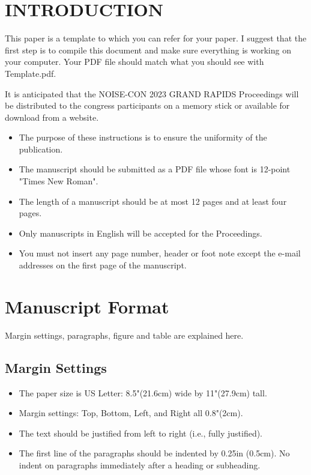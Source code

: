 \documentclass[letterpaper,12pt]{article}
\begin{document}
\section{INTRODUCTION}

\noindent
This paper is a template to which you can refer for your paper.  I suggest that the first step is to compile this document and make sure everything is working on your computer.  Your PDF file should match what you should see with Template.pdf. 

It is anticipated that the NOISE-CON 2023 GRAND RAPIDS Proceedings will be distributed to the congress participants on a memory stick or available for download from a website. 

\begin{itemize}[noitemsep]
\item 
The purpose of these instructions is to ensure the uniformity of the publication. 
\item
The manuscript should be submitted as a PDF file whose font is 12-point "Times New Roman".
\item
The length of a manuscript should be at most 12 pages and at least four pages. 
\item
Only manuscripts in English will be accepted for the Proceedings. 
\item
You must not insert any page number, header or foot note except the e-mail addresses on the first page of the manuscript.
\end{itemize}
 
 
\section{Manuscript Format}
\noindent
Margin settings, paragraphs, figure and table are explained here. 

\subsection{Margin Settings}
\begin{itemize}[noitemsep]
\item
The paper size is US Letter: 8.5"(21.6cm) wide by 11"(27.9cm) tall.
\item
Margin settings: Top, Bottom, Left, and Right all 0.8"(2cm).
\item
The text should be justified from left to right (i.e., fully justified).
\item
The first line of the paragraphs should be indented by 0.25in (0.5cm).  No indent on paragraphs immediately after a heading or subheading.
\end{itemize}
\end{document}
